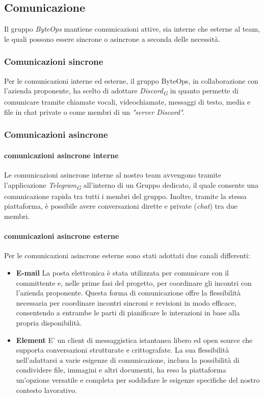 \documentclass{article}
\begin{document}
    \subsection{Comunicazione}
    Il gruppo \textit{ByteOps} mantiene comunicazioni attive, sia interne che esterne al team, le quali possono essere sincrone o asincrone a seconda delle necessità.
    \subsubsection{Comunicazioni sincrone}
    Per le comunicazioni interne ed esterne, il gruppo ByteOps, in collaborazione con l'azienda proponente, ha scelto di adottare \textit{Discord}\textsubscript{\textit{G}} in quanto permette di comunicare tramite chiamate vocali, videochiamate, messaggi di testo, media e file in chat private o come membri di un \textit{"server Discord"}.
    \subsubsection{Comunicazioni asincrone}
        \paragraph{comunicazioni asincrone interne}
        Le comunicazioni asincrone interne al nostro team avvengono tramite l'applicazione \textit{Telegram}\textsubscript{\textit{G}} all'interno di un Gruppo dedicato, il quale consente una comunicazione rapida tra tutti i membri del gruppo. Inoltre, tramite la stessa piattaforma, è possibile avere conversazioni dirette e private (\textit{chat}) tra due membri.
        \paragraph{comunicazioni asincrone esterne}
        Per le comunicazioni asincrone esterne sono stati adottati due canali differenti:
        \begin{itemize}
            \item \textbf{E-mail} La posta elettronica è stata utilizzata per comunicare con il committente e, nelle prime fasi del progetto, per coordinare gli incontri con l'azienda proponente. Questa forma di comunicazione offre la flessibilità necessaria per coordinare incontri sincroni e revisioni in modo efficace, consentendo a entrambe le parti di pianificare le interazioni in base alla propria disponibilità.
            \item \textbf{Element} E' un client di messaggistica istantanea libero ed open source che supporta conversazioni strutturate e crittografate. La sua flessibilità nell'adattarsi a varie esigenze di comunicazione, inclusa la possibilità di condividere file, immagini e altri documenti, ha reso la piattaforma un'opzione versatile e completa per soddisfare le esigenze specifiche del nostro contesto lavorativo.
        \end{itemize}
    
\end{document}

